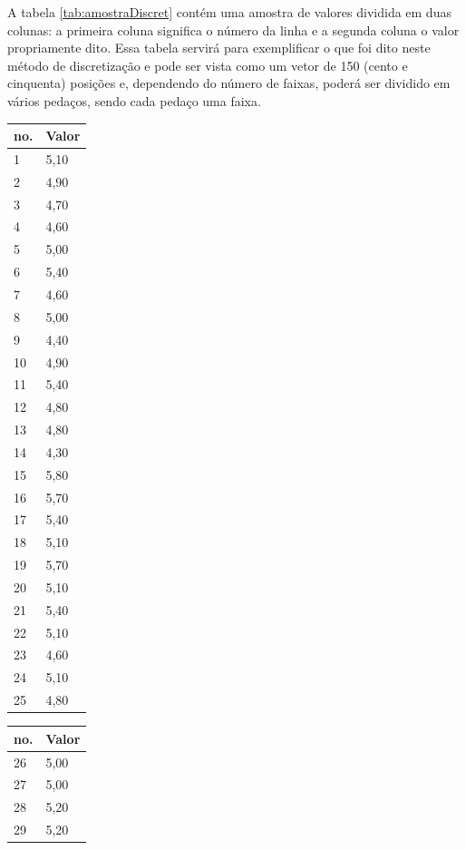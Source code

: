 A tabela \ref{tab:amostraDiscret} contém uma amostra de valores dividida em duas colunas: a primeira coluna significa o número da linha e a segunda coluna o valor propriamente dito. Essa tabela servirá para exemplificar o que foi dito neste método de discretização e pode ser vista como um vetor de 150 (cento e cinquenta) posições e, dependendo do número de faixas, poderá ser dividido em vários pedaços, sendo cada pedaço uma faixa. 

\begin{table}[!ht]
\centering

\begin{tabular}{|l|l|}
\hline 
 no. & Valor \\ \hline
1	&	5,10	\\ \hline
2	&	4,90	\\ \hline
3	&	4,70	\\ \hline
4	&	4,60	\\ \hline
5	&	5,00	\\ \hline
6	&	5,40	\\ \hline
7	&	4,60	\\ \hline
8	&	5,00	\\ \hline
9	&	4,40	\\ \hline
10	&	4,90	\\ \hline
11	&	5,40	\\ \hline
12	&	4,80	\\ \hline
13	&	4,80	\\ \hline
14	&	4,30	\\ \hline
15	&	5,80	\\ \hline
16	&	5,70	\\ \hline
17	&	5,40	\\ \hline
18	&	5,10	\\ \hline
19	&	5,70	\\ \hline
20	&	5,10	\\ \hline
21	&	5,40	\\ \hline
22	&	5,10	\\ \hline
23	&	4,60	\\ \hline
24	&	5,10	\\ \hline
25	&	4,80	\\ \hline
\end{tabular}
\begin{tabular}{ |l|l| }
\hline
 no. & Valor \\ \hline
26	&	5,00	\\ \hline
27	&	5,00	\\ \hline
28	&	5,20	\\ \hline
29	&	5,20	\\ \hline

\end{tabular}
\end{table}
